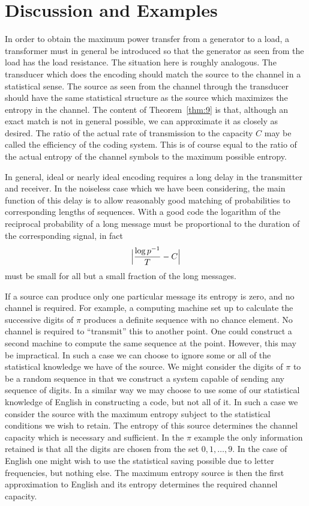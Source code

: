 \section{Discussion and Examples}

In order to obtain the maximum power transfer from a generator to a
load, a transformer must in general be introduced so that the generator
as seen from the load has the load resistance.  The situation here is
roughly analogous.  The transducer which does the encoding should match
the source to the channel in a statistical sense.  The source as seen
from the channel through the transducer should have the same statistical
structure as the source which maximizes the entropy in the channel.
The content of Theorem~\ref{thm:9} is that, although an exact match is
not in general possible, we can approximate it as closely as desired.
The ratio of the actual rate of transmission to the capacity $C$ may
be called the efficiency of the coding system.  This is of course equal
to the ratio of the actual entropy of the channel symbols to the maximum
possible entropy.

In general, ideal or nearly ideal encoding requires a long delay in
the transmitter and receiver.  In the noiseless case which we have been
considering, the main function of this delay is to allow reasonably good
matching of probabilities to corresponding lengths of sequences.  With a
good code the logarithm of the reciprocal probability of a long message
must be proportional to the duration of the corresponding signal, in fact
$$
\Bigl| \frac{\log p^{-1}}{T} - C \Bigr|
$$
must be small for all but a small fraction of the long messages.

If a source can produce only one particular message its entropy is zero,
and no channel is required.  For example, a computing machine set up to
calculate the successive digits of $\pi$ produces a definite sequence with
no chance element.  No channel is required to ``transmit'' this to another
point.  One could construct a second machine to compute the same sequence
at the point.  However, this may be impractical.  In such a case we can
choose to ignore some or all of the statistical knowledge we have of the
source.  We might consider the digits of $\pi$ to be a random sequence
in that we construct a system capable of sending any sequence of digits.
In a similar way we may choose to use some of our statistical knowledge
of English in constructing a code, but not all of it.  In such a case we
consider the source with the maximum entropy subject to the statistical
conditions we wish to retain.  The entropy of this source determines the
channel capacity which is necessary and sufficient.  In the $\pi$ example
the only information retained is that all the digits are chosen from the
set $0, 1,\dots, 9$.  In the case of English one might wish to use the
statistical saving possible due to letter frequencies, but nothing else.
The maximum entropy source is then the first approximation to English
and its entropy determines the required channel capacity.

